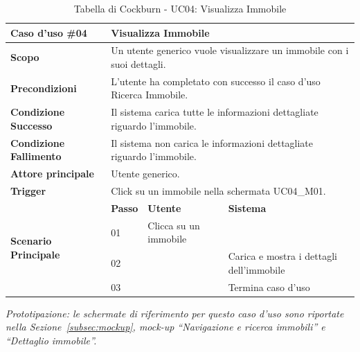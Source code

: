 \documentclass[a4paper,11pt]{article}
\renewcommand{\arraystretch}{1.18}
\begin{document}
\clearpage














\begin{table}[H]
\centering
\renewcommand{\arraystretch}{1.5}
\begin{tabular}{|p{2.8cm}|p{0.8cm}|p{4.2cm}|p{4.2cm}|}
\hline
\rowcolor[HTML]{010066} 
{\color[HTML]{EFEFEF} \textbf{Caso d'uso \#04}} & \multicolumn{3}{l|}{\color[HTML]{FFFFFF} \textbf{Visualizza Immobile}} \\ \hline
\textbf{Scopo} & \multicolumn{3}{l|}{Un utente generico vuole visualizzare un immobile con i suoi dettagli.} \\ \hline
\textbf{Precondizioni} & \multicolumn{3}{l|}{L'utente ha completato con successo il caso d'uso Ricerca Immobile.} \\ \hline
\textbf{Condizione Successo} & \multicolumn{3}{l|}{Il sistema carica tutte le informazioni dettagliate riguardo l'immobile.} \\ \hline
\textbf{Condizione Fallimento} & \multicolumn{3}{l|}{Il sistema non carica le informazioni dettagliate riguardo l'immobile.} \\ \hline
\textbf{Attore principale} & \multicolumn{3}{l|}{Utente generico.} \\ \hline
\textbf{Trigger} & \multicolumn{3}{l|}{Click su un immobile nella schermata UC04\_M01.} \\ \hline

\multirow{4}{2.8cm}{\textbf{Scenario Principale}} 
   & \textbf{Passo} & \textbf{Utente} & \textbf{Sistema} \\ \cline{2-4}
   & 01 & Clicca su un immobile & \\ \cline{2-4}
   & 02 & & Carica e mostra i dettagli dell'immobile \\ \cline{2-4}
   & 03 & & Termina caso d'uso \\ \hline

\end{tabular}
\caption{Tabella di Cockburn - UC04: Visualizza Immobile}
\end{table}
\smallskip
\noindent\textit{Prototipazione: le schermate di riferimento per questo caso d'uso sono riportate nella Sezione~\ref{subsec:mockup}, mock-up ``Navigazione e ricerca immobili'' e ``Dettaglio immobile''.}
\end{document}
